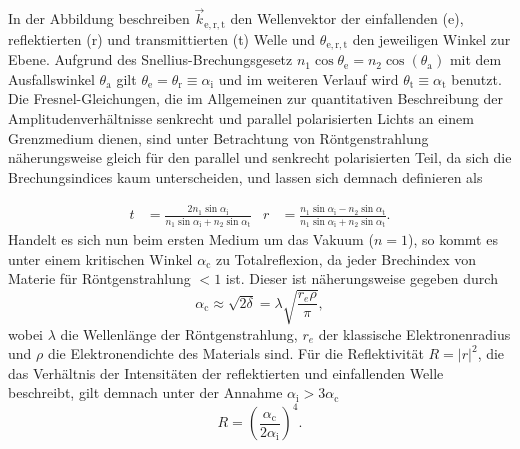 In der Abbildung beschreiben $\vec{k}_\mathrm{e,r,t}$ den Wellenvektor der einfallenden (e), reflektierten (r) und transmittierten (t) Welle und $\theta_\mathrm{e,r,t}$ den jeweiligen Winkel zur Ebene.
Aufgrund des Snellius-Brechungsgesetz $n_1 \cos {\theta_\mathrm{e}} = n_2 \cos (\theta_\mathrm{a}) $ mit dem Ausfallswinkel $\theta_\mathrm{a}$ gilt $\theta_\mathrm{e} = \theta_\mathrm{r} \equiv \alpha_\mathrm{i}$ und im weiteren Verlauf wird $\theta_\mathrm{t} \equiv \alpha_\mathrm{t}$ benutzt.
Die Fresnel-Gleichungen, die im Allgemeinen zur quantitativen Beschreibung der Amplitudenverhältnisse senkrecht und parallel polarisierten Lichts an einem Grenzmedium dienen, sind unter Betrachtung von Röntgenstrahlung näherungsweise gleich für den parallel und senkrecht polarisierten Teil, da sich die Brechungsindices kaum unterscheiden, und lassen sich demnach definieren als

\begin{align*}
  t &= \frac{2 n_1 \sin \alpha_\mathrm{i}}{n_1 \sin \alpha_\mathrm{i} + n_2 \sin \alpha_\mathrm{t}} &
  r &= \frac{ n_1 \sin \alpha_\mathrm{i} - n_2 \sin \alpha_\mathrm{t}}{n_1 \sin \alpha_\mathrm{i} + n_2 \sin \alpha_\mathrm{t}}.
\end{align*}
Handelt es sich nun beim ersten Medium um das Vakuum ($n=1$), so kommt es unter einem kritischen Winkel $\alpha_\mathrm{c}$ zu Totalreflexion, da jeder Brechindex von Materie für Röntgenstrahlung $<1$ ist.
Dieser ist näherungsweise gegeben durch
\begin{equation}
  \alpha_\mathrm{c} \approx \sqrt{2\delta} = \lambda \sqrt{\frac{r_e \rho}{\pi}},
  \label{eqn:nocheine}
\end{equation}
wobei $\lambda$ die Wellenlänge der Röntgenstrahlung, $r_e$ der klassische Elektronenradius und $\rho$ die Elektronendichte des Materials sind.
Für die Reflektivität $R = |r|^2$, die das Verhältnis der Intensitäten der reflektierten und einfallenden Welle beschreibt, gilt demnach unter der Annahme $\alpha_\mathrm{i} > 3 \alpha_\mathrm{c}$
\begin{equation}
  R = \left( \frac{\alpha_\mathrm{c}}{2 \alpha_\mathrm{i}} \right)^4.
  \label{eqn:fresnel}
\end{equation}

